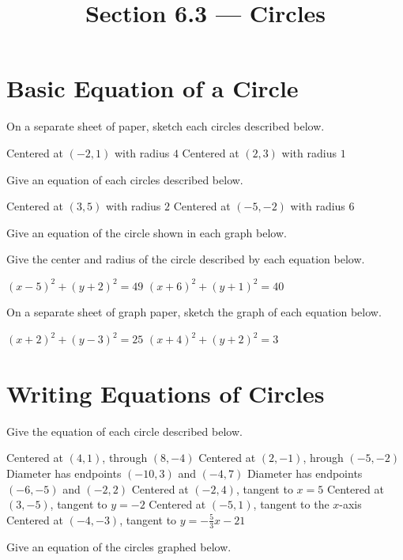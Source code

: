 

\title{Section 6.3 --- Circles}


\maketitle

\section*{Basic Equation of a Circle}
On a separate sheet of paper, sketch each circles described below.
\begin{smenum}
\mitemxx
{Centered at $(-2,1)$ with radius $4$}
{Centered at $(2,3)$ with radius $1$}
\end{smenum}
Give an equation of each circles described below.
\begin{smenum}
\mitemxx
{Centered at $(3,5)$ with radius $2$}
{Centered at $(-5,-2)$ with radius $6$}
\end{smenum}
Give an equation of the circle shown in each graph below.
\begin{smenum}
\mitemxx
{}
{}
\end{smenum}
Give the center and radius of the circle described by each equation below.
\begin{smenum}
\mitemxx
{$(x-5)^2+(y+2)^2=49$}
{$(x+6)^2+(y+1)^2=40$}
\end{smenum}
On a separate sheet of graph paper, sketch the graph of each equation below.
\begin{smenum}
\mitemxx
{$(x+2)^2+(y-3)^2=25$}
{$(x+4)^2+(y+2)^2=3$}
\end{smenum}

\section*{Writing Equations of Circles}
Give the equation of each circle described below.
\begin{smenum}
\mitemxx
{Centered at $(4,1)$, through $(8,-4)$}
{Centered at $(2,-1)$, hrough $(-5,-2)$}
\mitemxx
{Diameter has endpoints $(-10,3)$ and $(-4,7)$}
{Diameter has endpoints $(-6,-5)$ and $(-2,2)$}
\mitemxx
{Centered at $(-2,4)$, tangent to $x=5$}
{Centered at $(3,-5)$, tangent to $y=-2$}
\mitemxx
{Centered at $(-5,1)$, tangent to the $x$-axis}
{Centered at $(-4,-3)$, tangent to $y=-\frac{5}{3}x-21$}
\end{smenum}
Give an equation of the circles graphed below.
\begin{smenum}
\mitemxx
{}
{}
\end{smenum}

